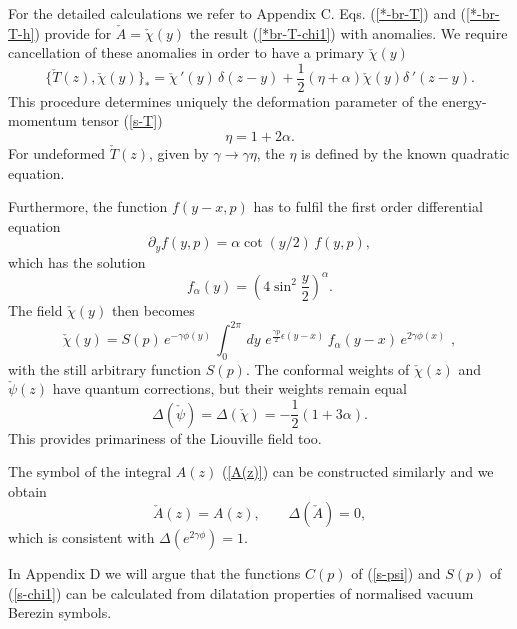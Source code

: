 \documentclass[a4paper,12pt]{article}
\begin{document}
For the detailed calculations we refer to Appendix C.
Eqs. (\ref{*-br-T}) and (\ref{*-br-T-h}) provide for ${\check
  A}=\check\chi (y)$ the result (\ref{*br-T-chi1}) with
anomalies. We require cancellation of these anomalies  in order to have
a primary  $\check \chi(y)$
\begin{equation}\label{*br-T-chi}
\{\check T (z),\check\chi(y)\}_*=\check\chi\,'(y)\,\delta (z-y) +
\frac{1}{2}
\left(\eta +\alpha\right)\check\chi(y)\delta\,'(z-y).
\end{equation}
This procedure determines uniquely the deformation parameter of the
energy-momentum tensor (\ref{s-T})
\begin{equation}\label{eta}
\eta =1 +{2\alpha}.
\end{equation}
For undeformed $\check T (z)$, given by $\gamma \rightarrow
\gamma\eta$, the $\eta$ is defined by the known quadratic
equation.

\noindent
Furthermore, the function $f(y-x,p)$ has to fulfil the first order
differential equation
\begin{equation}\label{f_alpha}
\partial_yf(y,p)=\alpha\cot (y/2)\,f(y,p),
\end{equation}
which has the solution
\begin{equation}\label{f-gamma}
f_\alpha (y) =\left(4\sin^2\frac{y}{2}\right)^{\alpha}.
\end{equation}
The field $\check\chi(y)$ then becomes
\begin{equation}\label{s-chi1}
{\check\chi}(y)=S(p)\,e^{-\gamma\phi (y)}\,\int_0^{2\pi}\,
dy\,\,e^{\frac{\gamma p}{2}\epsilon(y-x)}\,
f_\alpha (y-x)\,e^{2\gamma\phi(x)}\,\,,
\end{equation}
with the still arbitrary function $S(p)$.
The conformal weights of $\check\chi (z)$ and $\check\psi (z)$
have  quantum corrections,  but their weights remain equal
\begin{equation}\label{delta-psi-chi}
\Delta (\check \psi) = \Delta (\check \chi) =
-\frac{1}{2}\left(1+{3\alpha}\right).
\end{equation}
This provides primariness of
the Liouville field too.

\noindent
The symbol of the integral $A(z)$ (\ref{A(z)})  can be constructed
similarly and we obtain
\begin{equation}\label{s-A}
   {\check A}(z) =A(z),~~~~~~~~~\Delta(\check A)=0,
\end{equation}
which is consistent with
$\Delta(e^{2\gamma\phi})=1$.

\noindent
In Appendix D we will argue that the functions $C(p)$
of (\ref{s-psi}) and $S(p)$ of (\ref{s-chi1}) can be calculated
from dilatation properties of normalised vacuum Berezin symbols.
\end{document}
